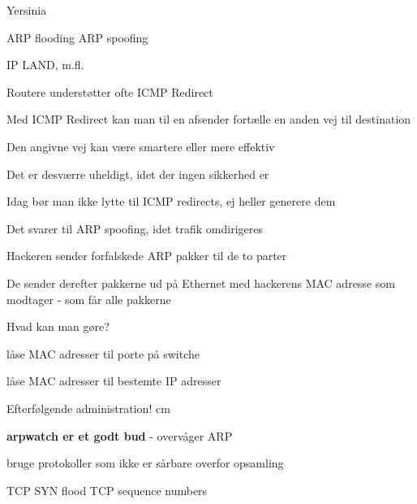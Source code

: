 \documentclass[Screen16to9,17pt]{foils}
\begin{document}

Yersinia

ARP flooding
ARP spoofing

IP
LAND, m.fl.



\begin{list1}
\item Routere understøtter ofte ICMP Redirect
\item Med ICMP Redirect kan man til en afsender fortælle en anden vej til destination
\item Den angivne vej kan være smartere eller mere effektiv
\item Det er desværre uheldigt, idet der ingen sikkerhed er
\item Idag bør man ikke lytte til ICMP redirects, ej heller generere dem
\item Det svarer til ARP spoofing, idet trafik omdirigeres
\end{list1}




\begin{list1}
\item Hackeren sender forfalskede ARP pakker til de to parter
\item De sender derefter pakkerne ud på Ethernet med hackerens MAC
  adresse som modtager - som får alle pakkerne
\end{list1}


\begin{list1}
\item Hvad kan man gøre?
\item låse MAC adresser til porte på switche
\item låse MAC adresser til bestemte IP adresser
\item Efterfølgende administration!
 cm
\item {\bfseries arpwatch er et godt bud} - overvåger ARP
\item bruge protokoller som ikke er sårbare overfor opsamling
\end{list1}




TCP SYN flood
TCP sequence numbers
\end{document}
